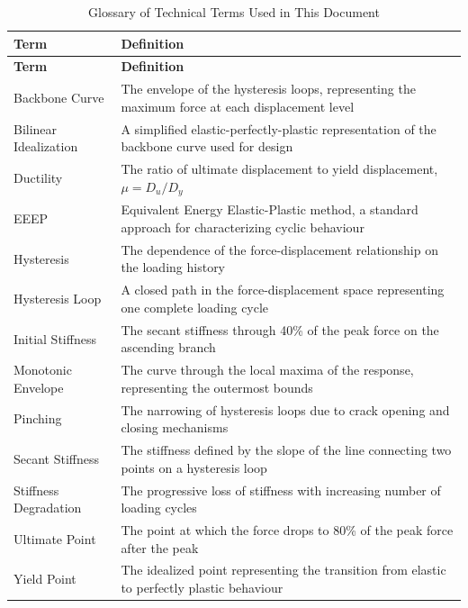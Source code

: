 \documentclass[11pt,a4paper]{article}
\begin{document}
\begin{longtable}{p{3cm}p{11cm}}
\caption{Glossary of Technical Terms Used in This Document}\label{tab:glossary}\\
\toprule
\textbf{Term} & \textbf{Definition} \\
\midrule
\endfirsthead
\toprule
\textbf{Term} & \textbf{Definition} \\
\midrule
\endhead
Backbone Curve & The envelope of the hysteresis loops, representing the maximum force at each displacement level \\
Bilinear Idealization & A simplified elastic-perfectly-plastic representation of the backbone curve used for design \\
Ductility & The ratio of ultimate displacement to yield displacement, \(\mu = D_u/D_y\) \\
EEEP & Equivalent Energy Elastic-Plastic method, a standard approach for characterizing cyclic behaviour \\
Hysteresis & The dependence of the force-displacement relationship on the loading history \\
Hysteresis Loop & A closed path in the force-displacement space representing one complete loading cycle \\
Initial Stiffness & The secant stiffness through 40\% of the peak force on the ascending branch \\
Monotonic Envelope & The curve through the local maxima of the response, representing the outermost bounds \\
Pinching & The narrowing of hysteresis loops due to crack opening and closing mechanisms \\
Secant Stiffness & The stiffness defined by the slope of the line connecting two points on a hysteresis loop \\
Stiffness Degradation & The progressive loss of stiffness with increasing number of loading cycles \\
Ultimate Point & The point at which the force drops to 80\% of the peak force after the peak \\
Yield Point & The idealized point representing the transition from elastic to perfectly plastic behaviour \\
\bottomrule
\end{longtable}
\end{document}
